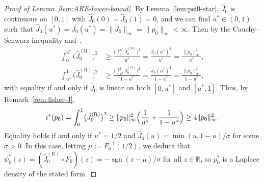 \documentclass[a4paper]{article}
\newcommand{\R}{\mathbb{R}}
\newcommand{\norm}[1]{\|{#1}\|}
\DeclareMathOperator{\sgn}{sgn}
\theoremstyle{definition}
\begin{document}
\begin{proof}[Proof of Lemma~\ref{lem:ARE-lower-bound}]
By Lemma~\ref{lem:psi0-star}, $\hat{J}_0$ is continuous on $[0,1]$ with $\hat{J}_0(0) = \hat{J}_0(1) = 0$, and we can find $u^* \in (0,1)$ such that $\hat{J}_0(u^*) = J_0(u^*) = \norm{J_0}_\infty = \norm{p_0}_\infty < \infty$. Then by the Cauchy--Schwarz inequality and~\citet[Corollary~24.2.1]{rockafellar97convex},
\begin{align*}
\int_0^{u^*} \bigl(\hat{J}_0^{(\mathrm{R})}\bigr)^2 &\geq \frac{\bigl(\int_0^{u^*} \hat{J}_0^{(\mathrm{R})}\bigr)^2}{u^*} = \frac{\hat{J}_0(u^*)^2}{u^*} = \frac{\norm{p_0}_\infty^2}{u^*}, \\
\int_{u^*}^1 \bigl(\hat{J}_0^{(\mathrm{R})}\bigr)^2 &\geq \frac{\bigl(\int_{u^*}^1 \hat{J}_0^{(\mathrm{R})}\bigr)^2}{1 - u^*} = \frac{\hat{J}_0(u^*)^2}{1 - u^*} = \frac{\norm{p_0}_\infty^2}{1 - u^*},
\end{align*}
with equality if and only if $\hat{J}_0$ is linear on both $[0,u^*]$ and $[u^*,1]$. Thus, by Remark~\ref{rem:fisher-J},
\[
i^*(p_0) = \int_0^1 \bigl(\hat{J}_0^{(\mathrm{R})}\bigr)^2 \geq \norm{p_0}_\infty^2 \Bigl(\frac{1}{u^*} + \frac{1}{1 - u^*}\Bigr) \geq 4\norm{p_0}_\infty^2.
\]
Equality holds if and only if $u^* = 1/2$ and $\hat{J}_0(u) = \min(u, 1 - u)/\sigma$ for some $\sigma > 0$. In this case, letting $\mu := F_0^{-1}(1/2)$, we deduce that $\psi_0^*(z) = (\hat{J}_0^{(\mathrm{R})} \circ F_0)(z) = -\sgn(z - \mu)/\sigma$ for all $z \in \R$, so $p_0^*$ is a Laplace density of the stated form.
\end{proof}
\end{document}
